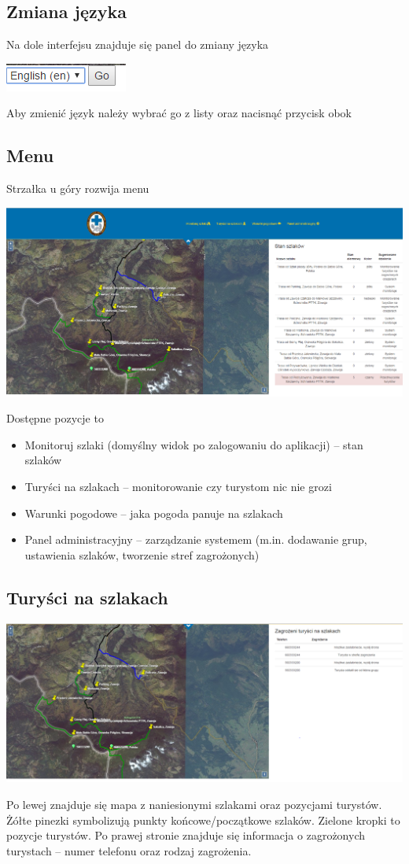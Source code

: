 \documentclass[a4paper,12pt]{article}
\begin{document}
\subsection{Zmiana języka}
Na dole interfejsu znajduje się panel do zmiany języka
\begin{center}
\includegraphics[scale=1]{language.png}
\end{center}
Aby zmienić język należy wybrać go z listy oraz nacisnąć przycisk obok
\subsection{Menu}
Strzałka u góry rozwija menu
\begin{center}
\includegraphics[scale=0.4]{ui2.png}
\end{center}
Dostępne pozycje to
\begin{itemize}
\item Monitoruj szlaki (domyślny widok po zalogowaniu do aplikacji) -- stan szlaków
\item Turyści na szlakach -- monitorowanie czy turystom nic nie grozi
\item Warunki pogodowe -- jaka pogoda panuje na szlakach
\item Panel administracyjny -- zarządzanie systemem (m.in. dodawanie grup, ustawienia szlaków, tworzenie stref zagrożonych)
\end{itemize}
\subsection{Turyści na szlakach}
\begin{center}
\includegraphics[scale=0.4]{ui3.png}
\end{center}
Po lewej znajduje się mapa z naniesionymi szlakami oraz pozycjami turystów. Żółte pinezki symbolizują punkty końcowe/początkowe szlaków. Zielone kropki to pozycje turystów. Po prawej stronie znajduje się informacja o zagrożonych turystach -- numer telefonu oraz rodzaj zagrożenia.
\end{document}

